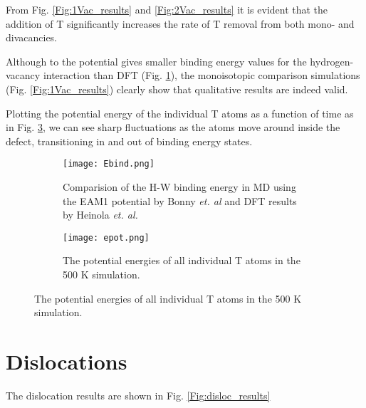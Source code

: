 From Fig. \ref{Fig:1Vac_results} and \ref{Fig:2Vac_results} it is evident that the addition of T significantly increases the rate of T removal from both mono- and divacancies. 

Although to the potential gives smaller binding energy values for the hydrogen-vacancy interaction than DFT (Fig. \ref{Fig:Ebind1H_DFT}), the monoisotopic comparison simulations (Fig. \ref{Fig:1Vac_results}) clearly show that qualitative results are indeed valid.


Plotting the potential energy of the individual T atoms as a function of time as in Fig. \ref{Fig:Epot}, we can see sharp fluctuations as the atoms move around inside the defect, transitioning in and out of binding energy states.


\begin{figure}[ht]
\begin{subfigure}{.48\textwidth}
	\center
	\texttt{[image: Ebind.png]}
	\caption{Comparision of the H-W binding energy in MD using the EAM1 potential by Bonny \textit{et. al} and DFT results by Heinola \textit{et. al. }\cite{heinolaTungstenDFT}}
	\label{Fig:Ebind1H_DFT}
\end{subfigure}
\hspace{3mm}
\begin{subfigure}{.48\textwidth}
	\center
	\texttt{[image: epot.png]}
	\caption{The potential energies of all individual T atoms in the 500 K simulation.}
	\label{Fig:Epot}
\end{subfigure}
\end{figure}


\section{Dislocations}
The dislocation results are shown in Fig. \ref{Fig:disloc_results}

